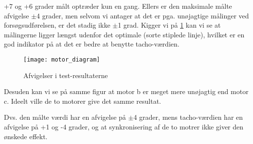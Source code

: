 +7 og +6 grader målt optræder kun en gang.
Ellers er den maksimale målte afvigelse $\pm$4 grader, men selvom vi antager at det er pga. unøjagtige målinger ved forsøgsudførelsen, er det stadig ikke $\pm$1 grad.
Kigger vi på \cref{sensor:motor_sensor_diagram} kan vi se at målingerne ligger længst udenfor det optimale (sorte stiplede linje), hvilket er en god indikator på at det er bedre at benytte tacho-værdien.

\begin{figure}
\texttt{[image: motor\_diagram]}
\caption{Afvigelser i test-resultaterne}
\label{sensor:motor_sensor_diagram}
\end{figure}

Desuden kan vi se på samme figur at motor b er meget mere unøjagtig end motor c.
Ideelt ville de to motorer give det samme resultat.

Dvs. den målte værdi har en afvigelse på $\pm$4 grader, mens tacho-værdien har en afvigelse på +1 og -4 grader, og at synkronisering af de to motrer ikke giver den ønskede effekt.
